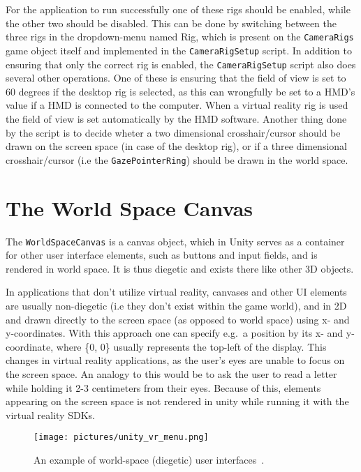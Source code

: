 For the application to run successfully one of these rigs should be enabled, while the other two should be disabled.
This can be done by switching between the three rigs in the dropdown-menu named Rig, which is present on the \texttt{CameraRigs} game object itself and
implemented in the \texttt{CameraRigSetup} script. In addition to ensuring that only the correct rig is enabled, 
the \texttt{CameraRigSetup} script also does several other operations. One of these is ensuring that the field of view is set to 60 degrees if the desktop rig 
is selected, as this can wrongfully be set to a HMD's value if a HMD is connected to the computer. When a virtual reality rig is used the field of view is 
set automatically by the HMD software. Another thing done by the script is to decide wheter a two dimensional crosshair/cursor should be drawn on the screen space
(in case of the desktop rig), or if a three dimensional crosshair/cursor (i.e the \texttt{GazePointerRing}) should be drawn in the world space. 


\section{The World Space Canvas}
The \texttt{WorldSpaceCanvas} is a canvas object, which in Unity serves as a container for other user interface elements, such as buttons and input fields, 
and is rendered in world space. It is thus diegetic and exists there like other 3D objects.

In applications that don't utilize virtual reality, canvases and other UI elements are usually non-diegetic (i.e they don't exist within the game world), 
and in 2D and drawn directly to the screen space (as opposed to world space) using x- and y-coordinates.
With this approach one can specify e.g.~a position by its x- and y-coordinate, where \{0, 0\} usually represents the top-left of the display.
This changes in virtual reality applications, as the user's eyes are unable to focus on the screen space. An analogy to this would be to 
ask the user to read a letter while holding it 2-3 centimeters from their eyes. Because of this, elements appearing on the screen space is not rendered
in unity while running it with the virtual reality SDKs. 

\begin{figure}%
	\texttt{[image: pictures/unity\_vr\_menu.png]}
	\caption[An example of world-space (diegetic) user interfaces]{An example of world-space (diegetic) user interfaces~\citep{Unity}.}
	\label{fig:unity_vr_menu}
\end{figure} 

